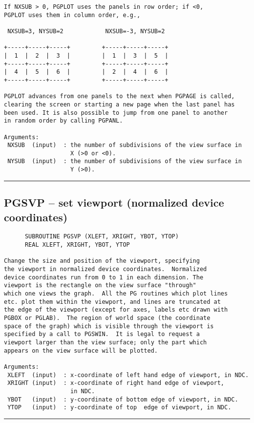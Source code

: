 {\begin{verbatim}
If NXSUB > 0, PGPLOT uses the panels in row order; if <0, 
PGPLOT uses them in column order, e.g.,
     
 NXSUB=3, NYSUB=2            NXSUB=-3, NYSUB=2   
                                               
+-----+-----+-----+         +-----+-----+-----+
|  1  |  2  |  3  |         |  1  |  3  |  5  |
+-----+-----+-----+         +-----+-----+-----+
|  4  |  5  |  6  |         |  2  |  4  |  6  |
+-----+-----+-----+         +-----+-----+-----+

PGPLOT advances from one panels to the next when PGPAGE is called,
clearing the screen or starting a new page when the last panel has
been used. It is also possible to jump from one panel to another
in random order by calling PGPANL.

Arguments:
 NXSUB  (input)  : the number of subdivisions of the view surface in
                   X (>0 or <0).
 NYSUB  (input)  : the number of subdivisions of the view surface in
                   Y (>0).
\end{verbatim}
\hrule


\subsection*{PGSVP -- set viewport (normalized device coordinates) }
\begin{verbatim}
      SUBROUTINE PGSVP (XLEFT, XRIGHT, YBOT, YTOP)
      REAL XLEFT, XRIGHT, YBOT, YTOP

Change the size and position of the viewport, specifying
the viewport in normalized device coordinates.  Normalized
device coordinates run from 0 to 1 in each dimension. The
viewport is the rectangle on the view surface "through"
which one views the graph.  All the PG routines which plot lines
etc. plot them within the viewport, and lines are truncated at
the edge of the viewport (except for axes, labels etc drawn with
PGBOX or PGLAB).  The region of world space (the coordinate
space of the graph) which is visible through the viewport is
specified by a call to PGSWIN.  It is legal to request a
viewport larger than the view surface; only the part which
appears on the view surface will be plotted.

Arguments:
 XLEFT  (input)  : x-coordinate of left hand edge of viewport, in NDC.
 XRIGHT (input)  : x-coordinate of right hand edge of viewport,
                   in NDC.
 YBOT   (input)  : y-coordinate of bottom edge of viewport, in NDC.
 YTOP   (input)  : y-coordinate of top  edge of viewport, in NDC.
\end{verbatim}
\hrule


}

